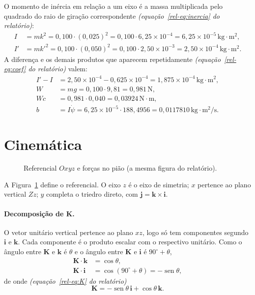 \documentclass[11pt,a4paper]{article}
\newcommand{\vet}[1]{\mathbf{#1}}
\newcommand{\seno}{\operatorname{sen}}
\newcommand{\un}[1]{\,\mathrm{#1}}
\newcommand{\psid}{\dot{\psi}}
\newcommand{\rel}[1]{\textit{(equação~\ref*{rel-eq:#1} do relatório)}}
\begin{document}
O momento de inércia em relação a um eixo é a massa multiplicada pelo quadrado do raio de giração correspondente \rel{inercia}:
\begin{align}
I  &= mk^2  = 0,100\cdot(0,025)^2 = 0,100\cdot6,25\times10^{-4} = 6,25\times10^{-5}\un{kg\cdot m^2},\\
I' &= mk'^2 = 0,100\cdot(0,050)^2 = 0,100\cdot2,50\times10^{-3} = 2,50\times10^{-4}\un{kg\cdot m^2}.
\end{align}
A diferença e os demais produtos que aparecem repetidamente \rel{coef} valem:
\begin{align}
I'-I &= 2,50\times10^{-4}-0,625\times10^{-4} = 1,875\times10^{-4}\un{kg\cdot m^2},\\
W &= mg = 0,100\cdot9,81 = 0,981\un{N},\\
Wc &= 0,981\cdot0,040 = 0,03924\un{N\cdot m},\\
b &= I\psid = 6,25\times10^{-5}\cdot188,4956 = 0,0117810\un{kg\cdot m^2/s}.\label{m:b}
\end{align}

\section{Cinemática}

\begin{figure}[H]
\centering

\caption{Referencial $Oxyz$ e forças no pião (a mesma figura do relatório).}
\label{m:fig:dcl}
\end{figure}

A Figura~\ref{m:fig:dcl} define o referencial. O eixo $z$ é o eixo de simetria; $x$ pertence ao plano vertical $Zz$; $y$ completa o triedro direto, com $\vet{j}=\vet{k}\times\vet{i}$.

\paragraph{Decomposição de $\vet{K}$.} O vetor unitário vertical pertence ao plano $xz$, logo só tem componentes segundo $\vet{i}$ e $\vet{k}$. Cada componente é o produto escalar com o respectivo unitário. Como o ângulo entre $\vet{K}$ e $\vet{k}$ é $\theta$ e o ângulo entre $\vet{K}$ e $\vet{i}$ é $90^\circ+\theta$,
\begin{align}
\vet{K}\cdot\vet{k} &= \cos\theta,\\
\vet{K}\cdot\vet{i} &= \cos(90^\circ+\theta) = -\seno\theta,
\end{align}
de onde \rel{K}
\begin{equation}
\vet{K}=-\seno\theta\,\vet{i}+\cos\theta\,\vet{k}.\label{m:K}
\end{equation}
\end{document}
